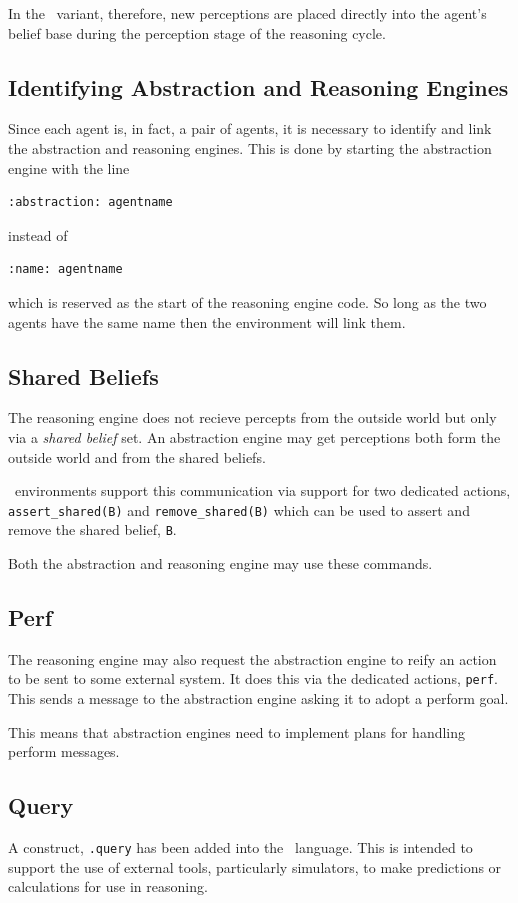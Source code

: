 \documentclass[a4]{article}
\begin{document}
In the \eass\ variant, therefore, new perceptions are placed directly into the agent's belief base during the perception stage of the reasoning cycle.

\subsection{Identifying Abstraction and Reasoning Engines}
Since each agent is, in fact, a pair of agents, it is necessary to identify and link the abstraction and reasoning engines.  This is done by starting the abstraction engine with the line
\begin{verbatim}
:abstraction: agentname
\end{verbatim} 
instead of 
\begin{verbatim}
:name: agentname
\end{verbatim} 
which is reserved as the start of the reasoning engine code.  So long as the two agents have the same name then the environment will link them.

\subsection{Shared Beliefs}
The reasoning engine does not recieve percepts from the outside world but only via a \emph{shared belief} set.  An abstraction engine may get perceptions both form the outside world and from the shared beliefs.

\eass\ environments support this communication via support for two dedicated actions, \lstinline{assert_shared(B)} and \lstinline{remove_shared(B)} which can be used to assert and remove the shared belief, \lstinline{B}.

Both the abstraction and reasoning engine may use these commands.

\subsection{Perf}
The reasoning engine may also request the abstraction engine to reify an action to be sent to some external system.  It does this via the dedicated actions, \texttt{perf}.  This sends a message to the abstraction engine asking it to adopt a perform goal.

This means that abstraction engines need to implement plans for handling perform messages.

\subsection{Query}
A construct, \texttt{.query} has been added into the \eass\ language.  This is intended to support the use of external tools, particularly simulators, to make predictions or calculations for use in reasoning.  
\end{document}
